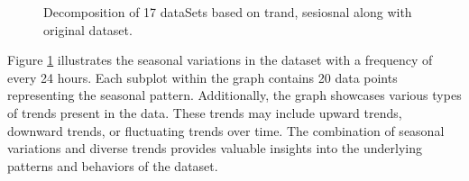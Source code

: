 \documentclass[a4paper,fleqn]{cas-sc}
\begin{document}
\begin{itemize}
\begin{figure}[h!]
  \centering
  \caption{Decomposition of 17 dataSets based on trand, sesiosnal along with original dataset.}
  \label{Eda}
\end{figure}
Figure \ref{Eda} illustrates the seasonal variations in the dataset with a frequency of every 24 hours. Each subplot within the graph contains 20 data points representing the seasonal pattern. Additionally, the graph showcases various types of trends present in the data. These trends may include upward trends, downward trends, or fluctuating trends over time. The combination of seasonal variations and diverse trends provides valuable insights into the underlying patterns and behaviors of the dataset.
\end{itemize}
\end{document}
